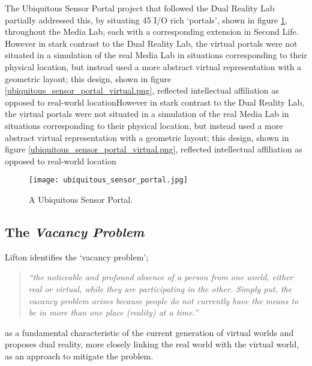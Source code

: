 The Ubiquitous Sensor Portal project that followed the Dual Reality Lab partially addressed this, by situating 45 I/O rich `portals', shown in figure \ref{ubiquitous_sensor_portal.jpg}, throughout the Media Lab, each with a corresponding extension in Second Life. However in stark contrast to the Dual Reality Lab, the virtual portals were not situated in a simulation of the real Media Lab in situations corresponding to their physical location, but instead used a more abstract virtual representation with a geometric layout; this design, shown in figure \ref{ubiquitous_sensor_portal_virtual.png}, reflected intellectual affiliation as opposed to real-world locationHowever in stark contrast to the Dual Reality Lab, the virtual portals were not situated in a simulation of the real Media Lab in situations corresponding to their physical location, but instead used a more abstract virtual representation with a geometric layout; this design, shown in figure \ref{ubiquitous_sensor_portal_virtual.png}, reflected intellectual affiliation as opposed to real-world location

\begin{figure}[h]
\centering
\texttt{[image: ubiquitous\_sensor\_portal.jpg]}
\caption{A Ubiquitous Sensor Portal.}
\label{ubiquitous_sensor_portal.jpg}
\end{figure}


\subsection{The \textit{Vacancy Problem}}

Lifton identifies the `vacancy problem';
\begin{quote}
\textit{``the noticeable and profound absence of a person from one world, either real or virtual, while they are participating in the other. Simply put, the vacancy problem arises because people do not currently have the means to be in more than one place (reality) at a time.''}
\end{quote}
as a fundamental characteristic of the current generation of virtual worlds and proposes dual reality, more closely linking the real world with the virtual world, as an approach to mitigate the problem.


